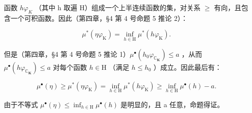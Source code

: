 函数 \(h\varphi_{K}\) （其中 h 取遍 H）组成一个上半连续函数的集，对关系 \(\geqslant\) 有向，且包含一个可积函数。因此（第四章，§4 第 4 号命题 5 推论 2）：

\[
\mu^ {*} (\eta \varphi_ {\mathrm{K}}) = \inf _ {h \in \mathrm{H}} \mu^ {*} (h \varphi_ {\mathrm{K}}).
\]

但是（第四章，§4 第 4 号命题 5 推论 1）\(\mu^{\bullet}(h_{0}\varphi_{\mathbb{C}_{\mathbf{K}}}) \leqslant a\) ，从而 \(\mu^{\bullet}(h\varphi_{\mathbb{C}_{\mathbf{K}}}) \leqslant a\) 对每个函数 \(h \in \mathrm{H}\) （满足 \(h \leqslant h_{0}\) ）成立。因此最后有：

\[
\mu^ {\bullet} (\eta) \geqslant \mu^ {*} (\eta \varphi_ {\mathrm{K}}) = \inf _ {h \in \mathrm{H}} \mu^ {*} (h \varphi_ {\mathrm{K}}) \geqslant \inf _ {h \in \mathrm{H}} \mu^ {\bullet} (h) - a.
\]

由于不等式 \(\mu^{\bullet}(\eta) \leqslant \inf_{h \in \mathrm{H}} \mu^{\bullet}(h)\) 是明显的，且 a 任意，命题得证。

